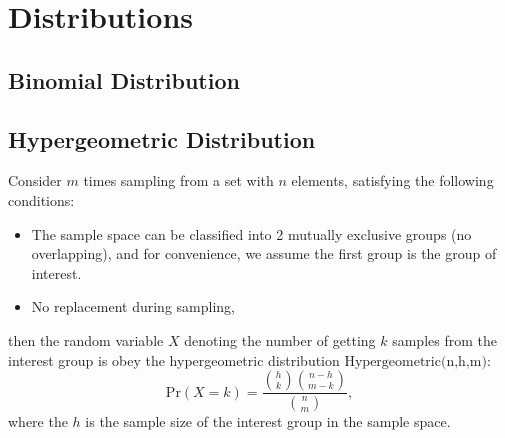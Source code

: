 
\section{Distributions}

\subsection{Binomial Distribution}

\subsection{Hypergeometric Distribution}
\begin{definition}
Consider $m$ times sampling from a set with $n$ elements, satisfying the following conditions:
\begin{itemize}
\item The sample space can be classified into 2 mutually exclusive groups (no overlapping), and for convenience, we assume the first group is the group of interest.
\item No replacement during sampling,
\end{itemize}
then the random variable $X$ denoting the number of getting $k$ samples from the interest group is obey the hypergeometric distribution $\text{Hypergeometric(n,h,m)}$:
\begin{equation}
\text{Pr}(X=k)=\frac{\binom{h}{k}\binom{n-h}{m-k}}{\binom{n}{m}},
\end{equation}
where the $h$ is the sample size of the interest group in the sample space.
\end{definition}

